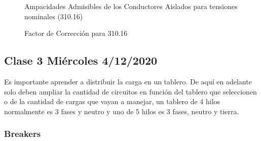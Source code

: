 \documentclass[11pt,letterpaper]{article}
\begin{document}
\begin{figure}[ht!]
	\centering
	\caption{Ampacidades Admisibles de los Conductores Aislados para tensiones nominales (310.16)}
\end{figure}

\begin{figure}[ht!]
	\centering
	\caption{Factor de Corrección para 310.16}
\end{figure}

\subsection{Clase 3 Miércoles 4/12/2020}
	Es importante aprender a distribuir la carga en un tablero. De aquí en adelante solo deben ampliar la cantidad de circuitos en función del tablero que seleccionen o de la cantidad de cargas que vayan a manejar, un tablero de 4 hilos normalmente es 3 fases y neutro y uno de 5 hilos es 3 fases, neutro y tierra.
	
\subsubsection{Breakers}	
\end{document}
